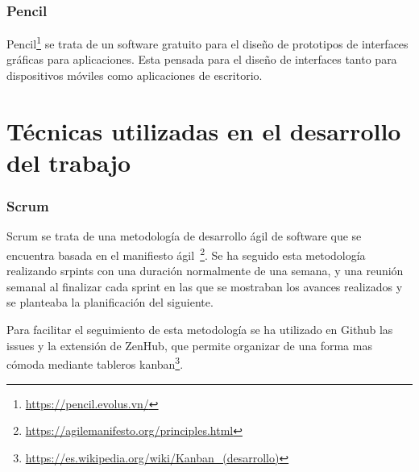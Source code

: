 \subsubsection{Pencil}
Pencil\footnote{\url{https://pencil.evolus.vn/}} se trata de un software gratuito para el diseño de prototipos de interfaces gráficas para aplicaciones. Esta pensada para el diseño de interfaces tanto para dispositivos móviles como aplicaciones de escritorio.

\section{Técnicas utilizadas en el desarrollo del trabajo}
\subsubsection{Scrum}
Scrum se trata de una metodología de desarrollo ágil de software que se encuentra basada en el manifiesto ágil~\footnote{\url{https://agilemanifesto.org/principles.html}}. Se ha seguido esta metodología realizando srpints con una duración normalmente de una semana, y una reunión semanal al finalizar cada sprint en las que se mostraban los avances realizados y se planteaba la planificación del siguiente.

Para facilitar el seguimiento de esta metodología se ha utilizado en Github las issues y la extensión de ZenHub, que permite organizar de una forma mas cómoda mediante tableros kanban\footnote{\url{https://es.wikipedia.org/wiki/Kanban_(desarrollo)}}.


